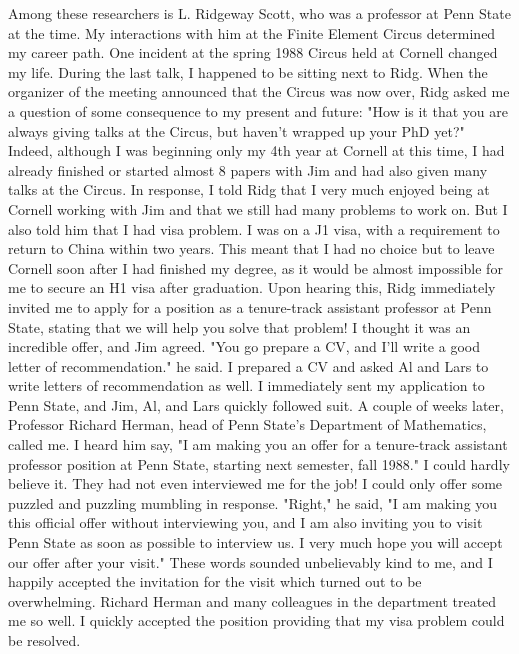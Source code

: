 \documentclass[CJK,11pt]{amsart}
\theoremstyle{definition}
\begin{document}
\begin{CJK*}{UTF8}{gbsn}
Among these researchers is L. Ridgeway Scott, who was a professor at Penn State at the time. My interactions with him at the Finite Element Circus determined my career path. One incident at the spring 1988 Circus held at Cornell changed my life. During the last talk, I happened to be sitting next to Ridg. When the organizer of the meeting announced that the Circus was now over, Ridg asked me a question of some consequence to my present and future: "How is it that you are always giving talks at the Circus, but haven't wrapped up your PhD yet?" Indeed, although I was beginning only my 4th year at Cornell at this time, I had already finished or started almost 8 papers with Jim and had also given many talks at the Circus. In response, I told Ridg that I very much enjoyed being at Cornell working with Jim and that we still had many problems to work on. But I also told him that I had visa problem. I was on a J1 visa, with a requirement to return to China within two years. This meant that I had no choice but to leave Cornell soon after I had finished my degree, as it would be almost impossible for me to secure an H1 visa after graduation. Upon hearing this, Ridg immediately invited me to apply for a position as a tenure-track assistant professor at Penn State, stating that we will help you solve that problem! I thought it was an incredible offer, and Jim agreed. "You go prepare a CV, and I'll write a good letter of recommendation." he said. I prepared a CV and asked Al and Lars to write letters of recommendation as well. I immediately sent my application to Penn State, and Jim, Al, and Lars quickly followed suit.  A couple of weeks later, Professor Richard Herman, head of Penn State's Department of Mathematics, called me. I heard him say, "I am making you an offer for a tenure-track assistant professor position at Penn State, starting next semester, fall 1988." I could hardly believe it. They had not even interviewed me for the job! I could only offer some puzzled and puzzling mumbling in response. "Right," he said, "I am making you this official offer without interviewing you, and I am also inviting you to visit Penn State as soon as possible to interview us. I very much hope you will accept our offer after your visit." These words sounded unbelievably kind to me, and I happily accepted the invitation for the visit which turned out to be overwhelming. Richard Herman and many colleagues in the department treated me so well. I quickly accepted the position providing that my visa problem could be resolved. 

\end{CJK*}
\end{document}
